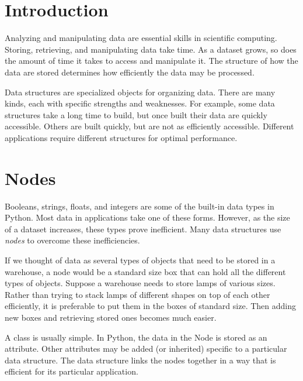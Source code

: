 \label{lab:Python_DataStructures}


\section*{Introduction}

Analyzing and manipulating data are essential skills in scientific computing.
Storing, retrieving, and manipulating data take time.
As a dataset grows, so does the amount of time it takes to access and manipulate it.
The structure of how the data are stored determines how efficiently the data may be processed.

Data structures are specialized objects for organizing data.
There are many kinds, each with specific strengths and weaknesses.
For example, some data structures take a long time to build, but once built their data are quickly accessible.
Others are built quickly, but are not as efficiently accessible.
Different applications require different structures for optimal performance.

\section*{Nodes}

Booleans, strings, floats, and integers are some of the built-in data types in Python.
Most data in applications take one of these forms.
However, as the size of a dataset increases, these types prove inefficient.
Many data structures use \emph{nodes} to overcome these inefficiencies.

If we thought of data as several types of objects that need to be stored in a warehouse, a node would be a standard size box that can hold all the different types of objects.
Suppose a warehouse needs to store lamps of various sizes.
Rather than trying to stack lamps of different shapes on top of each other efficiently, it is preferable to put them in the boxes of standard size.
Then adding new boxes and retrieving stored ones becomes much easier.

A  class is usually simple.
In Python, the data in the Node is stored as an attribute.
Other attributes may be added (or inherited) specific to a particular data structure.
The data structure links the nodes together in a way that is efficient for its particular application.

